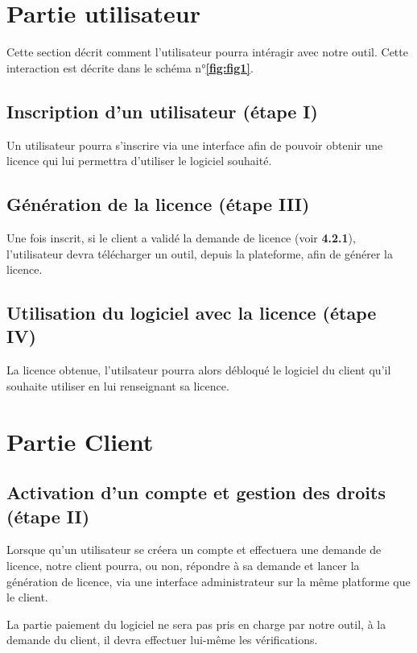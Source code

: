 \section{Partie utilisateur}

Cette section décrit comment l'utilisateur pourra intéragir avec notre outil. Cette interaction est décrite dans le schéma n°\textbf{\ref{fig:fig1}}.

\subsection{Inscription d'un utilisateur (étape I)}

Un utilisateur pourra s'inscrire via une interface afin de pouvoir obtenir une licence qui lui permettra d'utiliser le logiciel souhaité. 

\subsection{Génération de la licence (étape III)}

Une fois inscrit, si le client a validé la demande de licence (voir \textbf{4.2.1}), l'utilisateur devra télécharger un outil, depuis la
plateforme, afin de générer la licence.

\subsection{Utilisation du logiciel avec la licence (étape IV)}

La licence obtenue, l'utilsateur pourra alors débloqué le logiciel du client qu'il souhaite utiliser en lui renseignant
sa licence.

\section{Partie Client}

\subsection{Activation d'un compte et gestion des droits (étape II)}

Lorsque qu'un utilisateur se créera un compte et effectuera une demande de licence, notre client pourra, ou non, répondre
à sa demande et lancer la génération de licence, via une interface administrateur sur la même platforme que le client.

La partie paiement du logiciel ne sera pas pris en charge par notre outil, à la demande du client,
il devra effectuer lui-même les vérifications.


